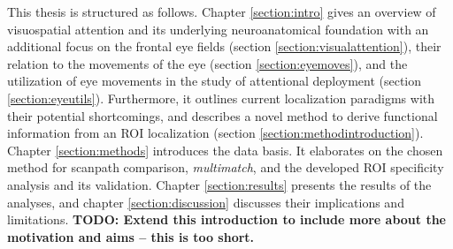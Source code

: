 \documentclass[a4paper, 12pt]{scrreprt}
\begin{document}
This thesis is structured as follows. Chapter \ref{section:intro} gives an overview of visuospatial attention and its underlying neuroanatomical foundation with an additional focus on the frontal eye fields (section \ref{section:visualattention}), their relation to the movements of the eye (section \ref{section:eyemoves}), and the utilization of eye movements in the study of attentional deployment (section \ref{section:eyeutils}). Furthermore, it outlines current localization paradigms with their potential shortcomings, and describes a novel method to derive functional information from an ROI localization (section \ref{section:methodintroduction}). Chapter \ref{section:methods} introduces the data basis. It elaborates on the chosen method for scanpath comparison, \textit{multimatch}, and the developed ROI specificity analysis and its validation. Chapter \ref{section:results} presents the results of the analyses, and chapter \ref{section:discussion} discusses their implications and limitations. \textbf{TODO: Extend this introduction to include more about the motivation and aims -- this is too short.}\pagebreak
\end{document}
